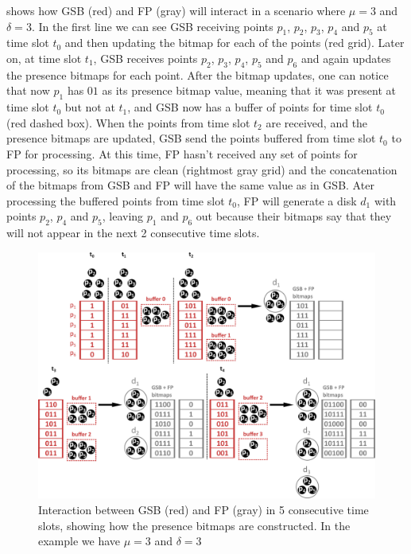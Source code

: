  shows how GSB (red) and FP (gray) will interact in a scenario where $\mu = 3$ and $\delta = 3$. In the
first line we can see GSB receiving points $p_1$, $p_2$, $p_3$, $p_4$ and $p_5$ at time slot $t_0$ and then updating the
bitmap for each of the points (red grid). Later on, at time slot $t_1$, GSB receives points $p_2$, $p_3$, $p_4$, $p_5$
and $p_6$ and again updates the presence bitmaps for each point. After the bitmap updates, one can notice that now $p_1$
has $01$ as its presence bitmap value, meaning that it was present at time slot $t_0$ but not at $t_1$, and GSB now has
a buffer of points for time slot $t_0$ (red dashed box). When the points from time slot $t_2$ are received, and the
presence bitmaps are updated, GSB send the points buffered from time slot $t_0$ to FP for processing. At this time, FP
hasn't received any set of points for processing, so its bitmaps are clean (rightmost gray grid) and the concatenation
of the bitmaps from GSB and FP will have the same value as in GSB. Ater processing the buffered points from time slot
$t_0$, FP will generate a disk $d_1$ with points $p_2$, $p_4$ and $p_5$, leaving $p_1$ and $p_6$ out because their
bitmaps say that they will not appear in the next 2 consecutive time slots.

\begin{figure}[h!]
    \centering
    \includegraphics[width=\linewidth]{images/gsb_fp_flow.png}
    \caption{Interaction between GSB (red) and FP (gray) in 5 consecutive time slots, showing how the presence bitmaps
        are constructed. In the example we have $\mu = 3$ and $\delta = 3$}
    \label{fig:gsb_fp_flow}
\end{figure}

